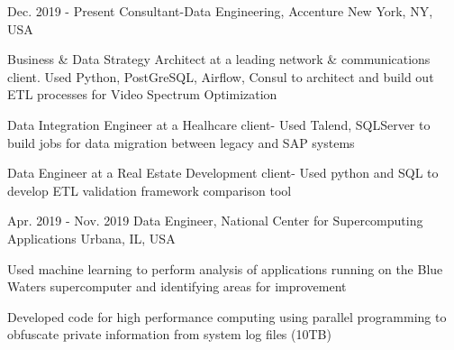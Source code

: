 \vspace{-4.0mm}


\begin{cventries}
{\vspace{-1.25mm}}

\cventry
    {Dec. 2019 - Present} %
    {Consultant-Data Engineering, Accenture} %
    {New York, NY, USA} %
    {} %
    {
      \begin{cvitems} %
        \item {Business \& Data Strategy Architect at a leading network \& communications client. Used Python, PostGreSQL, Airflow, Consul to architect and build out ETL processes for Video Spectrum Optimization}
        \item {Data Integration Engineer at a Healhcare client- Used Talend, SQLServer to build jobs for data migration between legacy and SAP systems}
        \item {Data Engineer at a Real Estate Development client- Used python and SQL to develop ETL validation framework comparison tool}
      \end{cvitems}
    }

  \cventry
    {Apr. 2019 - Nov. 2019} %
    {Data Engineer, National Center for Supercomputing Applications} %
    {Urbana, IL, USA} %
    {} %
    {
      \begin{cvitems} %
        \item{Used machine learning to perform analysis of applications running on the Blue Waters supercomputer and identifying areas for improvement}
        \item{Developed code for high performance computing using parallel programming to obfuscate private information from system log files (10TB)}
      \end{cvitems}
    }


\end{cventries}
